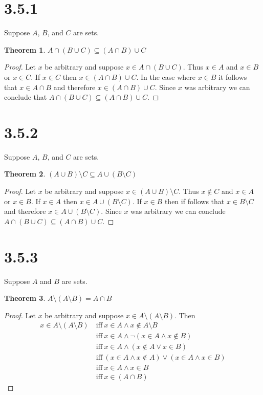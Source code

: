 \documentclass{article}
\newtheorem*{theorem}{Theorem}  %
\begin{document}
\section*{3.5.1}
Suppose $A$, $B$, and $C$ are sets.

\begin{theorem} $A \cap ( B \cup C ) \subseteq ( A \cap B ) \cup C $
\end{theorem}
\begin{proof}
Let $x$ be arbitrary and suppose $x \in A \cap ( B \cup C )$. Thus $x \in A$ and $x \in B$ or $x \in C$. If $x \in C$ then $x \in ( A \cap B ) \cup C$. In the case where $x \in B$ it follows that $x \in A \cap B$ and therefore $x \in ( A \cap B ) \cup C$. Since $x$ was arbitrary we can conclude that $A \cap ( B \cup C ) \subseteq ( A \cap B ) \cup C $.
\end{proof}

\section*{3.5.2}
Suppose $A$, $B$, and $C$ are sets.

\begin{theorem} $(A \cup B) \setminus C \subseteq A \cup (B \setminus C)$
\end{theorem}
\begin{proof}
Let $x$ be arbitrary and suppose $x \in ( A \cup B ) \setminus C$. Thus $x \notin C$ and $x \in A$ or $x \in B$. If $x \in A$ then $x \in A \cup ( B \setminus C )$. If $x \in B$ then if follows that $x \in B \setminus C$ and therefore $x \in A \cup ( B \setminus C )$. Since $x$ was arbitrary we can conclude $A \cap ( B \cup C ) \subseteq ( A \cap B ) \cup C$.
\end{proof}

\section*{3.5.3}
Suppose $A$ and $B$ are sets.

\begin{theorem} $A \setminus ( A \setminus B ) = A \cap B$
\end{theorem}

\begin{proof}
Let $x$ be arbitrary and suppose $x \in A \setminus ( A \setminus B )$. Then
\begin{align*}
x \in A \setminus ( A \setminus B ) ~ &\text{iff} ~ x \in A \land x \notin A \setminus B \\
&\text{iff} ~  x \in A \land \lnot ( x \in A \land x \notin B ) \\
&\text{iff} ~ x \in A \land ( x \notin A \lor x \in B ) \\
&\text{iff} ~ ( x \in A \land x \notin A ) \lor ( x \in A \land x \in B ) \\
&\text{iff} ~ x \in A \land x \in B \\
&\text{iff} ~ x \in ( A \cap B )
\end{align*}
\end{proof}
\end{document}
